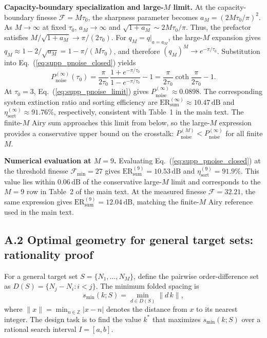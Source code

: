 \documentclass{optica-article}%
\begin{document}
\medskip\noindent\textbf{Capacity-boundary specialization and large-$M$ limit.}\quad
At the capacity-boundary finesse $\mathcal{F}=M\tau_0$, the sharpness parameter becomes $a_M=(2M\tau_0/\pi)^2$. As $M\to\infty$ at fixed $\tau_0$, $a_M\to\infty$ and $\sqrt{1+a_M}\sim 2M\tau_0/\pi$. Thus, the prefactor satisfies $M/\sqrt{1+a_M}\to\pi/(2\tau_0)$. For $q_M=q|_{a=a_M}$, the large-$M$ expansion gives $q_M\approx 1-2/\sqrt{a_M}=1-\pi/(M\tau_0)$, and therefore $(q_M)^M\to e^{-\pi/\tau_0}$. Substitution into Eq.~(\ref{eq:supp_pnoise_closed}) yields
\begin{equation}
P_{\mathrm{noise}}^{(\infty)}(\tau_0)
=\frac{\pi}{2\tau_0}\,\frac{1+e^{-\pi/\tau_0}}{1-e^{-\pi/\tau_0}}-1
=\frac{\pi}{2\tau_0}\coth\frac{\pi}{2\tau_0}-1.
\label{eq:supp_pnoise_limit}
\end{equation}
At $\tau_0=3$, Eq.~(\ref{eq:supp_pnoise_limit}) gives $P_{\mathrm{noise}}^{(\infty)}\approx 0.0898$. The corresponding system extinction ratio and sorting efficiency are $\mathrm{ER}_{\mathrm{sum}}^{(\infty)}\approx 10.47\,\mathrm{dB}$ and $\eta_{\mathrm{sort}}^{(\infty)}\approx 91.76\%$, respectively, consistent with Table~1 in the main text. The finite-$M$ Airy sum approaches this limit from below, so the large-$M$ expression provides a conservative upper bound on the crosstalk: $P_{\mathrm{noise}}^{(M)}<P_{\mathrm{noise}}^{(\infty)}$ for all finite $M$.

\medskip\noindent\textbf{Numerical evaluation at $M=9$.}\quad
Evaluating Eq.~(\ref{eq:supp_pnoise_closed}) at the threshold finesse $\mathcal{F}_{\min}=27$ gives $\mathrm{ER}_{\mathrm{sum}}^{(9)}=10.53\,\mathrm{dB}$ and $\eta_{\mathrm{sort}}^{(9)}=91.9\%$. This value lies within $0.06\,\mathrm{dB}$ of the conservative large-$M$ limit and corresponds to the $M=9$ row in Table~2 of the main text. At the measured finesse $\mathcal{F}=32.21$, the same expression gives $\mathrm{ER}_{\mathrm{sum}}^{(9)}=12.04\,\mathrm{dB}$, matching the finite-$M$ Airy reference used in the main text.

\subsection*{A.2 Optimal geometry for general target sets: rationality proof}

For a general target set $S=\{N_1,\dots,N_M\}$, define the pairwise order-difference set as $D(S)=\{N_j-N_i:i<j\}$. The minimum folded spacing is
\begin{equation}
s_{\min}(k;S)=\min_{d\in D(S)}\|d\,k\|,
\label{eq:supp_smin_general}
\end{equation}
where $\|x\|=\min_{n\in\mathbb{Z}}|x-n|$ denotes the distance from $x$ to its nearest integer. The design task is to find the value $k^*$ that maximizes $s_{\min}(k;S)$ over a rational search interval $I=[a,b]$.
\end{document}
